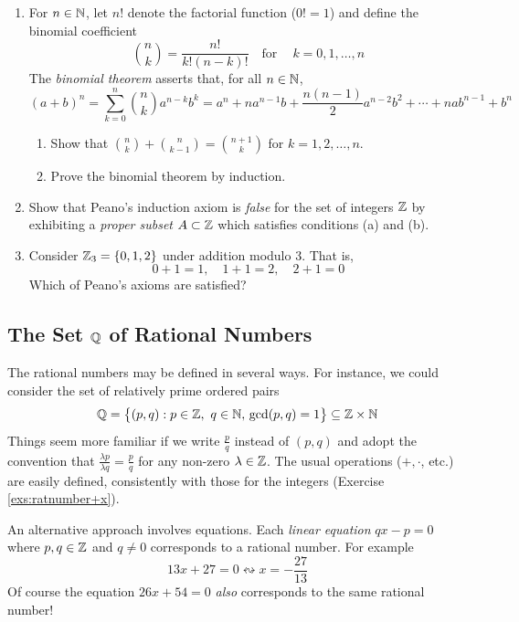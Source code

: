 \begin{exercises}{}{}
\begin{enumerate}
	  
	  \item%
		For $n\in\mathbb{N}$, let $n!$ denote the factorial function ($0!=1$) and define the binomial coefficient
	  \[
	  	\binom nk=\frac{n!}{k!(n-k)!}\quad\text{for}\quad\ k=0,1,\ldots,n
	  \]
	  The \emph{binomial theorem} asserts that, for all $n\in\mathbb{N}$,
	  \[
	  	(a+b)^n =\sum_{k=0}^n\binom nk a^{n-k}b^k
	  	=a^n+na^{n-1}b+\frac{n(n-1)}2a^{n-2}b^2+\cdots+nab^{n-1}+b^n
	  \]
	  \begin{enumerate}
	  	\item Show that $\binom nk+\binom n{k-1}=\binom{n+1}k$ for $k=1,2,\ldots,n$.
	  	\item Prove the binomial theorem by induction.
	  \end{enumerate}
	
	
	  \item Show that Peano's induction axiom is \emph{false} for the set of integers $\mathbb{Z}$ by exhibiting a \emph{proper subset} $A\subset\mathbb{Z}$ which satisfies conditions (a) and (b).
	  
	  
	  \item Consider $\mathbb{Z}_3=\{0,1,2\}$ under addition modulo 3. That is,
	  \[
	  	0+1=1,\quad 1+1=2,\quad 2+1=0
	  \]
	  Which of Peano's axioms are satisfied?
	\end{enumerate}
\end{exercises}


\clearpage



\subsection[The Set Q of Rational Numbers]{The Set $\mathbb{Q}$ of Rational Numbers}\label{sec:Q}

The rational numbers may be defined in several ways. For instance, we could consider the set of relatively prime ordered pairs
\[
	\mathbb{Q}=\bigl\{(p,q):p\in\mathbb{Z},\ q\in\mathbb{N},\, \gcd(p,q)=1\bigr\}\subseteq\mathbb{Z}\times\mathbb{N}
\]
Things seem more familiar if we write $\frac pq$ instead of $(p,q)$ and adopt the convention that $\frac{\lambda p}{\lambda q}=\frac pq$ for any non-zero $\lambda\in\mathbb{Z}$. The usual operations ($+,\cdot$, etc.) are easily defined, consistently with those for the integers (Exercise \ref{exs:ratnumber+x}).
\smallbreak

An alternative approach involves equations. Each \emph{linear equation} $qx-p=0$ where $p,q\in\mathbb{Z}$ and $q\neq 0$ corresponds to a rational number. For example
\[
	13x+27=0\leftrightsquigarrow x=-\frac{27}{13}
\]
Of course the equation $26x+54=0$ \emph{also} corresponds to the same rational number!
\medbreak

